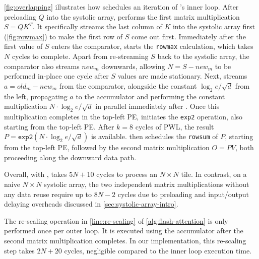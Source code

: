 \autoref{fig:overlapping} illustrates how \SA{} schedules an iteration of \FA{}'s inner loop.
After  preloading $Q$ into the systolic array,
\SA{} performs  the first matrix multiplication $S = Q K^T$.
It specifically streams the last column of $K$ into the systolic array first (\autoref{fig:rowmax})
to make the first row of $S$ come out first.
Immediately after the first value of $S$ enters the comparator,
\SA{} starts  the \texttt{rowmax} calculation, which takes $N$ cycles to complete.
Apart from re-streaming $S$ back to the systolic array,
the comparator also streams $new_m$ downwards,
allowing  $N = S - new_m$ to be performed in-place one cycle after $S$ values are made stationary.
Next, \SA{} streams  $a = old_m - new_m$ from the comparator,
alongside  the constant $\log_2 e / \sqrt{d}$ from the left, propagating $a$ to the accumulator and performing
the constant multiplication $N \cdot \log_2 e / \sqrt{d}$ in parallel immediately
after .
Once this multiplication completes in the top-left PE,
\SA{} initiates  the \texttt{exp2} operation,
also starting from the top-left PE. After $k = 8$ cycles of PWL, the result $P = \texttt{exp2}(N \cdot \log_2 e / \sqrt{d})$
is available.
\SA{} then schedules  the \texttt{rowsum} of $P$,
starting from the top-left PE, followed by  the second matrix
multiplication $O = PV$, both proceeding along the downward data path.

Overall, with \SA{}, \MSAGA{} takes $5 N + 10$ cycles to process an $N \times N$ \FA{} tile.
In contrast, on a naive $N \times N$ systolic array,
the two independent matrix multiplications without any data reuse require up to $8N-2$ cycles
due to preloading and input/output delaying overheads
discussed in \autoref{sec:systolic-array-intro}.

The re-scaling operation in \autoref{line:re-scaling} of \autoref{alg:flash-attention}
is only performed once per outer loop.
It is executed using the accumulator after the second matrix multiplication
completes.
In our implementation, this re-scaling step takes $2N + 20$ cycles,
negligible compared to the inner loop execution time.









